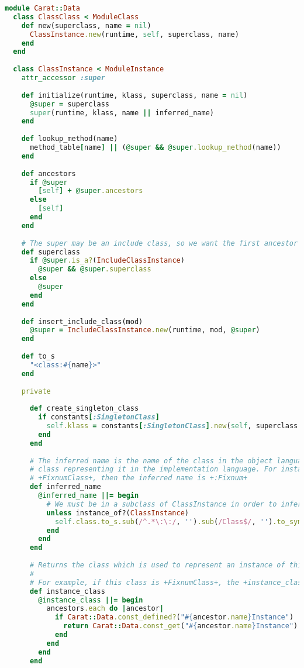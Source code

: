 \begin{lstlisting}[title={\small\ttfamily\bfseries data/class.rb},language=Ruby]
module Carat::Data
  class ClassClass < ModuleClass
    def new(superclass, name = nil)
      ClassInstance.new(runtime, self, superclass, name)
    end
  end
  
  class ClassInstance < ModuleInstance
    attr_accessor :super
    
    def initialize(runtime, klass, superclass, name = nil)
      @super = superclass
      super(runtime, klass, name || inferred_name)
    end
    
    def lookup_method(name)
      method_table[name] || (@super && @super.lookup_method(name))
    end
    
    def ancestors
      if @super
        [self] + @super.ancestors
      else
        [self]
      end
    end
    
    # The super may be an include class, so we want the first ancestor which is a "proper" class
    def superclass
      if @super.is_a?(IncludeClassInstance)
        @super && @super.superclass
      else
        @super
      end
    end
    
    def insert_include_class(mod)
      @super = IncludeClassInstance.new(runtime, mod, @super)
    end
    
    def to_s
      "<class:#{name}>"
    end
    
    private
    
      def create_singleton_class
        if constants[:SingletonClass]
          self.klass = constants[:SingletonClass].new(self, superclass && superclass.singleton_class)
        end
      end
      
      # The inferred name is the name of the class in the object language, taken from the name of the
      # class representing it in the implementation language. For instance, if this is an instance of
      # +FixnumClass+, then the inferred name is +:Fixnum+
      def inferred_name
        @inferred_name ||= begin
          # We must be in a subclass of ClassInstance in order to infer a name
          unless instance_of?(ClassInstance)
            self.class.to_s.sub(/^.*\:\:/, '').sub(/Class$/, '').to_sym
          end
        end
      end
      
      # Returns the class which is used to represent an instance of this class.
      # 
      # For example, if this class is +FixnumClass+, the +instance_class+ will be +FixnumInstance+
      def instance_class
        @instance_class ||= begin
          ancestors.each do |ancestor|
            if Carat::Data.const_defined?("#{ancestor.name}Instance")
              return Carat::Data.const_get("#{ancestor.name}Instance")
            end
          end
        end
      end
    

\end{lstlisting}
